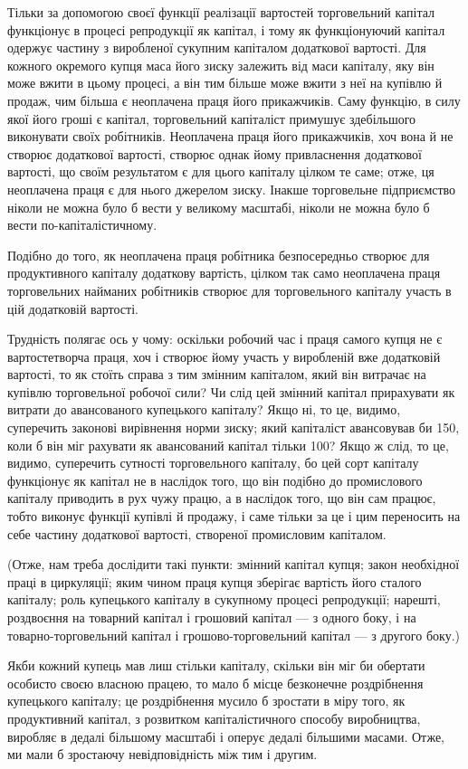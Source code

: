 Тільки за допомогою своєї функції реалізації вартостей торговельний
капітал функціонує в процесі репродукції як капітал,
і тому як функціонуючий капітал одержує частину з виробленої
сукупним капіталом додаткової вартості. Для кожного окремого
купця маса його зиску залежить від маси капіталу, яку він
може вжити в цьому процесі, а він тим більше може вжити
з неї на купівлю й продаж, чим більша є неоплачена праця його
прикажчиків. Саму функцію, в силу якої його гроші є капітал,
торговельний капіталіст примушує здебільшого виконувати своїх
робітників. Неоплачена праця його прикажчиків, хоч вона й не
створює додаткової вартості, створює однак йому привласнення
додаткової вартості, що своїм результатом є для цього капіталу
цілком те саме; отже, ця неоплачена праця є для нього
джерелом зиску. Інакше торговельне підприємство ніколи не
можна було б вести у великому масштабі, ніколи не можна
було б вести по-капіталістичному.

Подібно до того, як неоплачена праця робітника безпосередньо
створює для продуктивного капіталу додаткову вартість, цілком
так само неоплачена праця торговельних найманих робітників створює
для торговельного капіталу участь в цій додатковій вартості.

Трудність полягає ось у чому: оскільки робочий час і праця
самого купця не є вартостетворча праця, хоч і створює йому
участь у виробленій вже додатковій вартості, то як стоїть справа
з тим змінним капіталом, який він витрачає на купівлю торговельної
робочої сили? Чи слід цей змінний капітал прирахувати
як витрати до авансованого купецького капіталу? Якщо ні, то це,
видимо, суперечить законові вирівнення норми зиску; який капіталіст
авансовував би 150, коли б він міг рахувати як авансований
капітал тільки 100? Якщо ж слід, то це, видимо, суперечить
сутності торговельного капіталу, бо цей сорт капіталу
функціонує як капітал не в наслідок того, що він подібно до
промислового капіталу приводить в рух чужу працю, а в наслідок
того, що він сам працює, тобто виконує функції купівлі й продажу,
і саме тільки за це і цим переносить на себе частину
додаткової вартості, створеної промисловим капіталом.

(Отже, нам треба дослідити такі пункти: змінний капітал купця;
закон необхідної праці в циркуляції; яким чином праця купця
зберігає вартість його сталого капіталу; роль купецького капіталу
в сукупному процесі репродукції; нарешті, роздвоєння на
товарний капітал і грошовий капітал — з одного боку, і на товарно-торговельний
капітал і грошово-торговельний капітал —
з другого боку.)

Якби кожний купець мав лиш стільки капіталу, скільки він
міг би обертати особисто своєю власною працею, то мало б
місце безконечне роздрібнення купецького капіталу; це роздрібнення
мусило б зростати в міру того, як продуктивний капітал,
з розвитком капіталістичного способу виробництва, виробляє
в дедалі більшому масштабі і оперує дедалі більшими масами.
Отже, ми мали б зростаючу невідповідність між тим і другим.
\parbreak{}  %

